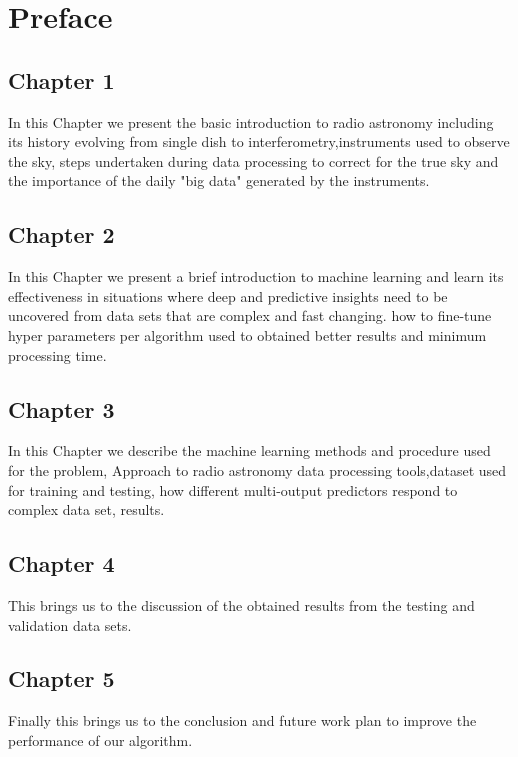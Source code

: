 \chapter*{Preface}

\section*{Chapter 1}
In this Chapter we present the basic introduction to radio astronomy including its history evolving from single dish to interferometry,instruments used to observe the sky, steps undertaken during data processing to correct for the true sky and the importance of the daily "big data" generated by the instruments.    
\section*{Chapter 2}
In this Chapter we present a brief introduction to machine learning and learn its effectiveness in situations where deep and predictive insights need to be uncovered from data sets that are complex and fast changing. how to fine-tune hyper parameters per algorithm used to obtained better results and minimum processing time.  
\section*{Chapter 3}
In this Chapter we describe the machine learning methods and procedure used for the problem, Approach to radio astronomy data processing tools,dataset used for training and testing, how different multi-output predictors respond to complex data set, results.
\section*{Chapter 4}
This brings us to the discussion of the obtained results from the testing and validation data sets.
\section*{Chapter 5}
Finally this brings us to the conclusion and future work plan to improve the performance of our algorithm. 

